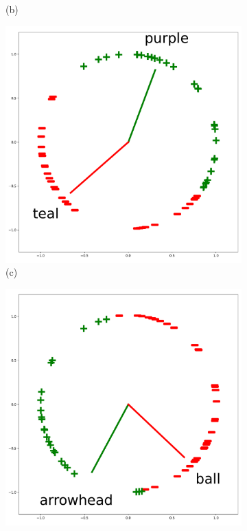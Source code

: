 \begin{figure}[h]
{\begin{subfigure}{0.25\textwidth}
            \caption*{(b)}
        \end{subfigure}%
        \hspace*{\fill}   %
        \begin{subfigure}{0.25\textwidth}
            \includegraphics[width=\linewidth]{figures/vision_and_language/clip_clocks/purple_teal.pdf}
            \caption*{(c)}
        \end{subfigure}%
        \hspace*{\fill}   %
        \begin{subfigure}{0.25\textwidth}
            \includegraphics[width=\linewidth]{figures/vision_and_language/clip_clocks/arrowhead_ball.pdf}

\end{subfigure}}
\end{figure}
